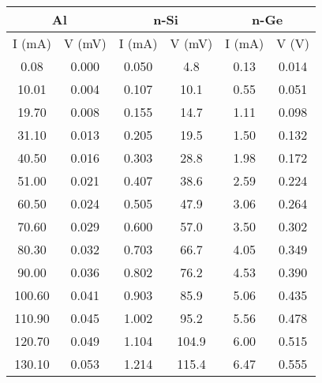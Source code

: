 \begin{table}[H]
    \centering
    \begin{tabular}{|cc|cc|cc|}
    \hline
    \multicolumn{2}{|c|}{Al} & \multicolumn{2}{c|}{n-Si} & \multicolumn{2}{c|}{n-Ge} \\ \hline
    \multicolumn{1}{|c|}{I (mA)} & V (mV) & \multicolumn{1}{c|}{I (mA)} & V (mV) & \multicolumn{1}{c|}{I (mA)} & V (V) \\ \hline
    \multicolumn{1}{|c|}{0.08} & 0.000 & \multicolumn{1}{c|}{0.050} & 4.8 & \multicolumn{1}{c|}{0.13} & 0.014 \\
    \multicolumn{1}{|c|}{10.01} & 0.004 & \multicolumn{1}{c|}{0.107} & 10.1 & \multicolumn{1}{c|}{0.55} & 0.051 \\
    \multicolumn{1}{|c|}{19.70} & 0.008 & \multicolumn{1}{c|}{0.155} & 14.7 & \multicolumn{1}{c|}{1.11} & 0.098 \\
    \multicolumn{1}{|c|}{31.10} & 0.013 & \multicolumn{1}{c|}{0.205} & 19.5 & \multicolumn{1}{c|}{1.50} & 0.132 \\
    \multicolumn{1}{|c|}{40.50} & 0.016 & \multicolumn{1}{c|}{0.303} & 28.8 & \multicolumn{1}{c|}{1.98} & 0.172 \\
    \multicolumn{1}{|c|}{51.00} & 0.021 & \multicolumn{1}{c|}{0.407} & 38.6 & \multicolumn{1}{c|}{2.59} & 0.224 \\
    \multicolumn{1}{|c|}{60.50} & 0.024 & \multicolumn{1}{c|}{0.505} & 47.9 & \multicolumn{1}{c|}{3.06} & 0.264 \\
    \multicolumn{1}{|c|}{70.60} & 0.029 & \multicolumn{1}{c|}{0.600} & 57.0 & \multicolumn{1}{c|}{3.50} & 0.302 \\
    \multicolumn{1}{|c|}{80.30} & 0.032 & \multicolumn{1}{c|}{0.703} & 66.7 & \multicolumn{1}{c|}{4.05} & 0.349 \\
    \multicolumn{1}{|c|}{90.00} & 0.036 & \multicolumn{1}{c|}{0.802} & 76.2 & \multicolumn{1}{c|}{4.53} & 0.390 \\
    \multicolumn{1}{|c|}{100.60} & 0.041 & \multicolumn{1}{c|}{0.903} & 85.9 & \multicolumn{1}{c|}{5.06} & 0.435 \\
    \multicolumn{1}{|c|}{110.90} & 0.045 & \multicolumn{1}{c|}{1.002} & 95.2 & \multicolumn{1}{c|}{5.56} & 0.478 \\
    \multicolumn{1}{|c|}{120.70} & 0.049 & \multicolumn{1}{c|}{1.104} & 104.9 & \multicolumn{1}{c|}{6.00} & 0.515 \\
    \multicolumn{1}{|c|}{130.10} & 0.053 & \multicolumn{1}{c|}{1.214} & 115.4 & \multicolumn{1}{c|}{6.47} & 0.555 \\

\end{tabular}
\end{table}

